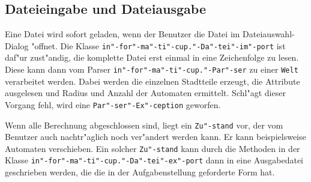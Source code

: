 \subsection{Dateieingabe und Dateiausgabe}
Eine Datei wird sofort geladen, wenn der Benutzer die Datei im Dateiauswahl-Dialog "offnet. Die Klasse \texttt{in"-for"-ma"-ti"-cup."-Da"-tei"-im"-port} ist daf"ur zust"andig, die komplette Datei erst einmal in eine Zeichenfolge zu lesen. Diese kann dann vom Parser \texttt{in"-for"-ma"-ti"-cup."-Par"-ser} zu einer \texttt{Welt} verarbeitet werden. Dabei werden die einzelnen Stadtteile erzeugt, die Attribute ausgelesen und Radius und Anzahl der Automaten ermittelt. Schl"agt dieser Vorgang fehl, wird eine \texttt{Par"-ser"-Ex"-ception} geworfen.

Wenn alle Berechnung abgeschlossen sind, liegt ein \texttt{Zu"-stand} vor, der vom Benutzer auch nachtr"aglich noch ver"andert werden kann. Er kann beispielsweise Automaten verschieben. Ein solcher \texttt{Zu"-stand} kann durch die Methoden in der Klasse \texttt{in"-for"-ma"-ti"-cup."-Da"-tei"-ex"-port} dann in eine Ausgabedatei geschrieben werden, die die in der Aufgabenstellung geforderte Form hat. 
